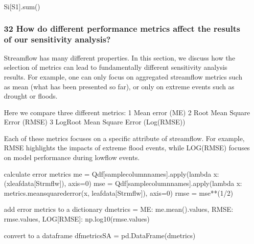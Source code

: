 \documentclass[letterpaper,10pt,english]{book}
\begin{document}
\begin{sphinxVerbatim}[commandchars=\\\{\}]
Si[\PYGZsq{}S1\PYGZsq{}].sum()
\end{sphinxVerbatim}

\begin{sphinxVerbatim}[commandchars=\\\{\}]
\end{sphinxVerbatim}


\subsubsection{3\sphinxhyphen{}2 How do different performance metrics affect the results of our sensitivity analysis?}
\label{\detokenize{A2_Jupyter_Notebooks:how-do-different-performance-metrics-affect-the-results-of-our-sensitivity-analysis}}
\sphinxAtStartPar
Streamflow has many different properties. In this section, we discuss
how the selection of metrics can lead to fundamentally different
sensitivity analysis results. For example, one can only focus on
aggregated streamflow metrics such as mean (what has been presented so
far), or only on extreme events such as drought or floods.

\sphinxAtStartPar
Here we compare three different metrics: 1\sphinxhyphen{} Mean error (ME) 2\sphinxhyphen{} Root Mean
Square Error (RMSE) 3\sphinxhyphen{} Log\sphinxhyphen{}Root Mean Square Error (Log(RMSE))

\sphinxAtStartPar
Each of these metrics focuses on a specific attribute of streamflow. For
example, RMSE highlights the impacts of extreme flood events, while
LOG(RMSE) focuses on model performance during low\sphinxhyphen{}flow events.

\begin{sphinxVerbatim}[commandchars=\\\{\}]
\PYGZsh{} calculate error metrics
me = Q\PYGZus{}df[sample\PYGZus{}column\PYGZus{}names].apply(lambda x: (x\PYGZhy{}leaf\PYGZus{}data[\PYGZdq{}Strmflw\PYGZdq{}]), axis=0)
mse = Q\PYGZus{}df[sample\PYGZus{}column\PYGZus{}names].apply(lambda x: metrics.mean\PYGZus{}squared\PYGZus{}error(x, leaf\PYGZus{}data[\PYGZdq{}Strmflw\PYGZdq{}]), axis=0)
rmse = mse**(1/2)

\PYGZsh{} add error metrics to a dictionary
d\PYGZus{}metrics = \PYGZob{}\PYGZsq{}ME\PYGZsq{}: me.mean().values,
             \PYGZsq{}RMSE\PYGZsq{}: rmse.values,
             \PYGZsq{}LOG[RMSE]\PYGZsq{}: np.log10(rmse.values)\PYGZcb{}

\PYGZsh{} convert to a dataframe
df\PYGZus{}metrics\PYGZus{}SA = pd.DataFrame(d\PYGZus{}metrics)
\end{sphinxVerbatim}
\end{document}
